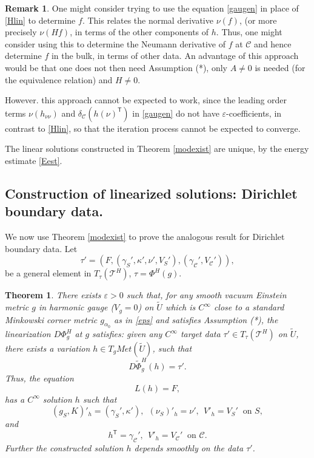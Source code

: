 \documentclass[10pt]{amsart}
\renewcommand{\a}{\alpha}
\newcommand{\g}{\gamma}
\renewcommand{\d}{\delta}
\newcommand{\e}{\varepsilon}
\renewcommand{\k}{\kappa}
\newcommand{\cC}{{\mathcal C}}
\newcommand{\cT}{{\mathcal T}}
\newcommand{\tT}{\mathsf{T}}
\newcommand{\be}{\begin{equation}}
\newcommand{\ee}{\end{equation}}
\newcommand{\<}{\langle}
\renewcommand{\>}{\rangle}
\newcommand{\w}{\widetilde}
\theoremstyle{plain}
\newtheorem{theorem}[lemma]{Theorem}
\theoremstyle{remark}
\theoremstyle{definition}
\newtheorem{remark}[lemma]{Remark}
\numberwithin{equation}{section}
\begin{document}
\begin{remark}
{\rm One might consider trying to use the equation \eqref{gaugen} in place of \eqref{Hlin} to determine $f$. This relates the normal derivative 
$\nu(f)$, (or more precisely $\nu(Hf)$, in terms of the other components of $h$. Thus, one might consider using this to determine 
the Neumann derivative of $f$ at $\cC$ and hence determine $f$ in the bulk, in terms of other data. An advantage of this approach would 
be that one does not then need Assumption (*), only $A \neq 0$ is needed (for the equivalence relation) and $H \neq 0$. 
  
   However. this approach cannot be expected to work, since the leading order terms $\nu(h_{\nu \nu})$ and $\d_{\cC}(h(\nu)^{\tT})$ in 
\eqref{gaugen} do not have $\e$-coefficients, in contrast to \eqref{Hlin}, so that the iteration process cannot be expected to converge.  
   }
\end{remark}

The linear solutions constructed in Theorem \ref{modexist} are unique, by the energy estimate \eqref{Eest}. 

  
 \subsection{Construction of linearized solutions: Dirichlet boundary data.} 
 
   We now use Theorem \ref{modexist} to prove the analogous result for Dirichlet boundary data. 
 Let 
 \be \label{tau'2}
\tau' = (F, (\g_S', \k', \nu', V_S'), (\g_{\cC}', V_{\cC}')),
\ee
be a general element in $T_{\tau}(\cT^H)$, $\tau = \Phi^H(g)$.  

\begin{theorem}\label{Direxist}
There exists $\e > 0$ such that, for any smooth vacuum Einstein metric $g$ in harmonic gauge ($V_g = 0$) on $\w U$ which is $C^{\infty}$ close to a 
standard Minkowski corner metric $g_{\a_0}$ as in \eqref{eps} and satisfies Assumption (*), the linearization $D \Phi_g^H$ at $g$ satisfies: given 
any $C^{\infty}$ target data $\tau' \in T_{\tau}(\cT^H)$ on $\w U$, there exists a variation $h \in T_g Met(\w U)$, such that 
\be \label{DPhisol}
D\w \Phi_g^H(h) =  \tau'.
\ee
Thus, the equation 
\be \label{LhF1}
L(h) = F,
\ee
has a $C^{\infty}$ solution $h$ such that 
\be \label{C1}
(g_S, K)'_h = (\g_S', \k'), \ \ (\nu_S)'_h = \nu', \ \ V'_h = V_S' \ \mbox{ on }S,
\ee
and
\be \label{C2}
h^{\tT}  = \g_{\cC}', \ \ V'_h = V_\cC' \ \mbox{ on }\cC.
\ee
Further the constructed solution $h$ depends smoothly on the data $\tau'$. 
\end{theorem}
  
\end{document}
